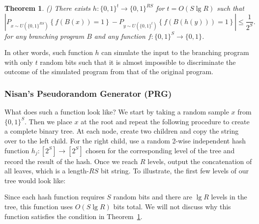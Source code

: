 \documentclass[11pt]{article}
\newtheorem{theorem}{Theorem}
\begin{document}
\begin{theorem} (\cite{Nisan92}) \label{thm:nisan}
There exists $h:\{0,1\}^{t}\rightarrow\{0,1\}^{RS}$ for $t=O(S\lg R)$ such that 
\begin{equation}
\left| P_{x\sim U(\{0,1\}^{RS})}\left\{ f(B(x))=1 \right\} -P_{y\sim U(\{0,1\}^{t})}\left\{ f(B(h(y)))=1 \right\} \right| \le \frac{1}{2^{S}}.
\end{equation}
for any branching program $B$ and any function $f:\{0,1\}^{S}\rightarrow\{0,1\}$. 
\end{theorem}

In other words, such function $h$ can simulate the input to the branching program with only $t$ random bits such that it is almost impossible to discriminate the outcome of the simulated program from that of the original program.

\subsubsection{Nisan's Pseudorandom Generator (PRG)}

What does such a function look like? We start by taking a random sample $x$ from $\{0,1\}^S$. Then we place $x$ at the root and repeat the following procedure to create a complete binary tree. At each node, create two children and copy the string over to the left child. For the right child, use a random 2-wise independent hash function $h_j:[2^S]\rightarrow[2^S]$ chosen for the corresponding level of the tree and record the result of the hash. Once we reach $R$ levels, output the concatenation of all leaves, which is a length-$RS$ bit string. To illustrate, the first few levels of our tree would look like:

\begin{center}
\end{center}

Since each hash function requires $S$ random bits and there are $\lg R$ levels in the tree, this function uses $O(S\lg R)$ bits total. We will not discuss why this function satisfies the condition in Theorem~\ref{thm:nisan}.
\end{document}
